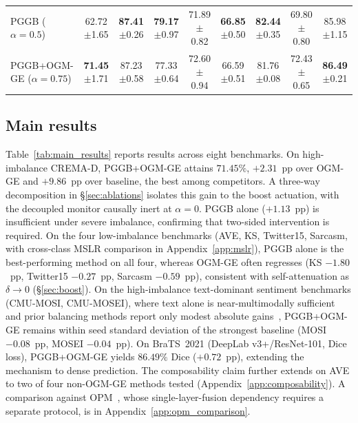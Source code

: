 \documentclass{article} %
\begin{document}
\begin{table}[H]
{\begin{tabular}{l cccccccc}
\midrule
PGGB ($\alpha{=}0.5$)     & 62.72{\scriptsize$\pm$1.65} & \textbf{87.41}{\scriptsize$\pm$0.26} & \textbf{79.17}{\scriptsize$\pm$0.97} & 71.89{\scriptsize$\pm$0.82} & \textbf{66.85}{\scriptsize$\pm$0.50} & \textbf{82.44}{\scriptsize$\pm$0.35} & 69.80{\scriptsize$\pm$0.80} & 85.98{\scriptsize$\pm$1.15} \\
PGGB+OGM-GE ($\alpha{=}0.75$) & \textbf{71.45}{\scriptsize$\pm$1.71} & 87.23{\scriptsize$\pm$0.58} & 77.33{\scriptsize$\pm$0.64} & 72.60{\scriptsize$\pm$0.94} & 66.59{\scriptsize$\pm$0.51} & 81.76{\scriptsize$\pm$0.08} & 72.43{\scriptsize$\pm$0.65} & \textbf{86.49}{\scriptsize$\pm$0.21} \\
\bottomrule
\end{tabular}%
}
\end{table}


\subsection{Main results}
\label{sec:main_results}
\vspace{-1em}

Table~\ref{tab:main_results} reports results across eight benchmarks. On high-imbalance CREMA-D, PGGB+OGM-GE attains $71.45\%$, $+2.31$~pp over OGM-GE and $+9.86$~pp over baseline, the best among competitors. A three-way decomposition in \S\ref{sec:ablations} isolates this gain to the boost actuation, with the decoupled monitor causally inert at $\alpha{=}0$. PGGB alone ($+1.13$~pp) is insufficient under severe imbalance, confirming that two-sided intervention is required. On the four low-imbalance benchmarks (AVE, KS, Twitter15, Sarcasm, with cross-class MSLR comparison in Appendix~\ref{app:mslr}), PGGB alone is the best-performing method on all four, whereas OGM-GE often regresses (KS $-1.80$~pp, Twitter15 $-0.27$~pp, Sarcasm $-0.59$~pp), consistent with self-attenuation as $\delta \to 0$ (\S\ref{sec:boost}). On the high-imbalance text-dominant sentiment benchmarks (CMU-MOSI, CMU-MOSEI), where text alone is near-multimodally sufficient and prior balancing methods report only modest absolute gains~\citep{li2023agm,wei2025dgl}, PGGB+OGM-GE remains within seed standard deviation of the strongest baseline (MOSI $-0.08$~pp, MOSEI $-0.04$~pp). On BraTS~2021 (DeepLab v3+/ResNet-101, Dice loss), PGGB+OGM-GE yields $86.49\%$ Dice ($+0.72$~pp), extending the mechanism to dense prediction. The composability claim further extends on AVE to two of four non-OGM-GE methods tested (Appendix~\ref{app:composability}). A comparison against OPM~\citep{wei2024opm}, whose single-layer-fusion dependency requires a separate protocol, is in Appendix~\ref{app:opm_comparison}.
\vspace{-1.2em}
\end{document}
